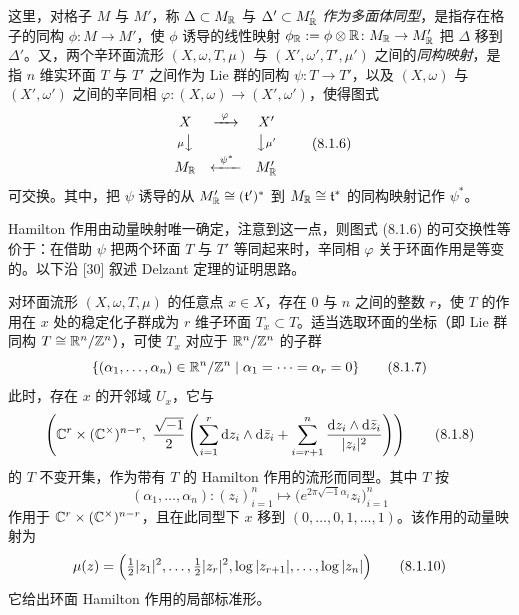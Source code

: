 
这里，对格子 $M$ 与 $M'$，称 $\Delta\subset M_{\mathbb{R}}$ 与 $\Delta'\subset M'_{\mathbb{R}}$ \emph{作为多面体同型}，是指存在格子的同构 $\phi\colon M\to M'$，使 $\phi$ 诱导的线性映射 $\phi_{\mathbb{R}}:=\phi\otimes\mathbb{R}\colon M_{\mathbb{R}}\to M'_{\mathbb{R}}$ 把 $\Delta$ 移到 $\Delta'$。又，两个辛环面流形 $(X,\omega,T,\mu)$ 与 $(X',\omega',T',\mu')$ 之间的\emph{同构映射}，是指 $n$ 维实环面 $T$ 与 $T'$ 之间作为 Lie 群的同构 $\psi\colon T\to T'$，以及 $(X,\omega)$ 与 $(X',\omega')$ 之间的辛同相 $\varphi\colon(X,\omega)\to(X',\omega')$，使得图式
\begin{equation}
  \begin{array}{ccc}
    X & \xrightarrow{\ \varphi\ } & X'\\[2pt]
    {\scriptstyle\mu}\big\downarrow & & \big\downarrow{\scriptstyle\mu'}\\[2pt]
    M_{\mathbb{R}} & \xleftarrow{\ \psi^{*}\ } & M'_{\mathbb{R}}
  \end{array}
  \tag{8.1.6}
\end{equation}
可交换。其中，把 $\psi$ 诱导的从 $M'_{\mathbb{R}}\cong(\mathfrak{t}')^*$ 到 $M_{\mathbb{R}}\cong\mathfrak{t}^*$ 的同构映射记作 $\psi^*$。

Hamilton 作用由动量映射唯一确定，注意到这一点，则图式 (8.1.6) 的可交换性等价于：在借助 $\psi$ 把两个环面 $T$ 与 $T'$ 等同起来时，辛同相 $\varphi$ 关于环面作用是等变的。以下沿 [30] 叙述 Delzant 定理的证明思路。

对环面流形 $(X,\omega,T,\mu)$ 的任意点 $x\in X$，存在 $0$ 与 $n$ 之间的整数 $r$，使 $T$ 的作用在 $x$ 处的稳定化子群成为 $r$ 维子环面 $T_x\subset T$。适当选取环面的坐标（即 Lie 群同构 $T\cong\mathbb{R}^n/\mathbb{Z}^n$），可使 $T_x$ 对应于 $\mathbb{R}^n/\mathbb{Z}^n$ 的子群
\begin{equation}
  \{(\alpha_1,\dots,\alpha_n)\in\mathbb{R}^n/\mathbb{Z}^n\mid \alpha_1=\cdots=\alpha_r=0\} \tag{8.1.7}
\end{equation}
此时，存在 $x$ 的开邻域 $U_x$，它与
\begin{equation}
  \left(\C^r\times(\C^\times)^{n-r},\ \frac{\sqrt{-1}}{2}\left(\sum_{i=1}^{r}\rd z_i\wedge\rd\bar z_i+\sum_{i=r+1}^{n}\frac{\rd z_i\wedge\rd\bar z_i}{|z_i|^2}\right)\right) \tag{8.1.8}
\end{equation}
的 $T$ 不变开集，作为带有 $T$ 的 Hamilton 作用的流形而同型。其中 $T$ 按
\begin{equation}
  (\alpha_1,\dots,\alpha_n)\colon (z_i)_{i=1}^{n}\mapsto\bigl(e^{2\pi\sqrt{-1}\alpha_i}z_i\bigr)_{i=1}^{n} \tag{8.1.9}
\end{equation}
作用于 $\mathbb{C}^r\times(\mathbb{C}^\times)^{n-r}$，且在此同型下 $x$ 移到 $(0,\dots,0,1,\dots,1)$。该作用的动量映射为
\begin{equation}
  \mu(z)=\Bigl(\tfrac12|z_1|^2,\dots,\tfrac12|z_r|^2,\log|z_{r+1}|,\dots,\log|z_n|\Bigr) \tag{8.1.10}
\end{equation}
它给出环面 Hamilton 作用的局部标准形。

